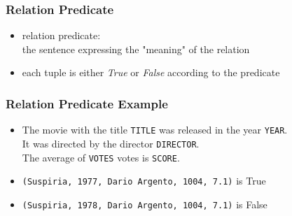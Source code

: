 \documentclass[dvipsnames]{beamer}
\theoremstyle{plain}
\begin{document}
\begin{frame}
  \frametitle{Relation Predicate}

  \begin{itemize}
    \item \alert{relation predicate}:\\
      the sentence expressing the "meaning" of the relation
    \item each tuple is either \emph{True} or \emph{False} according to the
      predicate
  \end{itemize}
\end{frame}

\begin{frame}
  \frametitle{Relation Predicate Example}

  \begin{itemize}
    \item The movie with the title \texttt{TITLE} was released in the year
      \texttt{YEAR}.\\
      It was directed by the director \texttt{DIRECTOR}.\\
      The average of \texttt{VOTES} votes is \texttt{SCORE}.

    \pause
    \medskip
    \item \texttt{(Suspiria, 1977, Dario Argento, 1004, 7.1)} is True
    \item \texttt{(Suspiria, 1978, Dario Argento, 1004, 7.1)} is False
  \end{itemize}
\end{frame}
\end{document}
